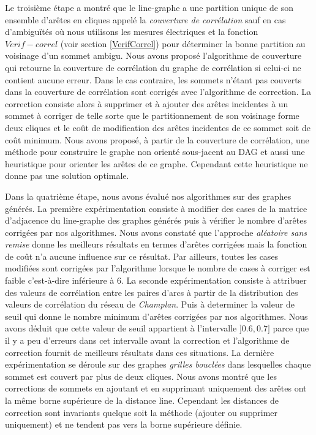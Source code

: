 Le troisi\`eme \'etape a montr\'e que le line-graphe a une partition unique de son ensemble d'ar\^etes en cliques appel\'e la {\em couverture de corr\'elation} sauf en cas d'ambigu\"{i}t\'es o\`u nous utilisons les mesures \'electriques et la fonction $Verif-correl$ (voir section \ref{VerifCorrel}) pour d\'eterminer la bonne partition au voisinage d'un sommet ambigu. 
Nous avons propos\'e  l'algorithme de couverture qui retourne la couverture de corr\'elation du graphe de corr\'elation si celui-ci ne contient aucune erreur. 
Dans le cas contraire, les sommets n'\'etant pas couverts dans la couverture de corr\'elation sont corrig\'es avec l'algorithme de correction. La correction consiste alors \`a supprimer et \`a ajouter des ar\^etes incidentes \`a un sommet \`a corriger de telle sorte que le partitionnement de son voisinage forme deux cliques et le co\^ut de modification des ar\^etes incidentes de ce sommet soit de co\^ut minimum. 
Nous avons propos\'e, \`a partir de la couverture de corr\'elation, une m\'ethode pour construire le graphe non orient\'e  sous-jacent au DAG et aussi une heuristique pour orienter les ar\^etes de ce graphe. Cependant cette heuristique ne donne pas une solution optimale.
\newline

Dans la quatri\`eme \'etape, nous avons \'evalu\'e nos algorithmes sur des graphes g\'en\'er\'es. 
La premi\`ere exp\'erimentation consiste \`a modifier des cases de la matrice d'adjacence du line-graphe des graphes g\'en\'er\'es puis \`a v\'erifier le nombre d'ar\^etes corrig\'ees par nos algorithmes.  
Nous avons constat\'e que l'approche {\em al\'eatoire sans remise} donne les meilleurs r\'esultats en termes d'ar\^etes corrig\'ees mais la fonction de co\^ut n'a aucune influence sur ce r\'esultat. 
Par ailleurs, toutes les cases modifi\'ees sont corrig\'ees par l'algorithme lorsque le nombre de cases \`a corriger est faible c'est-\`a-dire inf\'erieure \`a $6$. 
La seconde exp\'erimentation consiste \`a attribuer des valeurs de corr\'elation entre les paires d'arcs \`a partir de la distribution des valeurs de corr\'elation du r\'eseau de {\em Champlan}. 
Puis \`a determiner la valeur de seuil qui donne le nombre minimum d'ar\^etes corrig\'ees par nos algorithmes. 
Nous avons d\'eduit que cette valeur de seuil appartient \`a l'intervalle $]0.6,0.7]$ parce que il y a peu d'erreurs dans cet intervalle avant la correction et l'algorithme de correction fournit de meilleurs r\'esultats dans ces situations.     
La derni\`ere exp\'erimentation se d\'eroule sur des graphes {\em grilles boucl\'ees} dans lesquelles chaque sommet est couvert par plus de deux cliques. Nous avons  montr\'e que les corrections de sommets en ajoutant et en supprimant uniquement des ar\^etes ont la m\^eme borne sup\'erieure de la distance line. Cependant les distances de correction sont invariants quelque soit la m\'ethode (ajouter ou supprimer uniquement)  et ne tendent pas vers la borne sup\'erieure d\'efinie.
\newline

